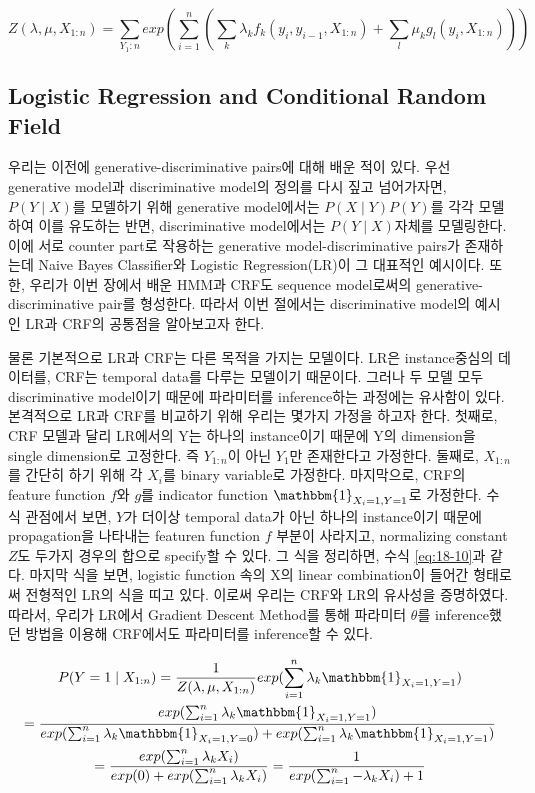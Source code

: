 \documentclass[draft=false]{oblivoir}
\begin{document}
\begin{equation}
	Z(\lambda,\mu,X_{1:n})=\sum_{Y_1:n}exp(\sum_{i=1}^{n}(\sum_k\lambda_k f_k(y_i,y_{i-1},X_{1:n})+\sum_l{\mu_k g_l(y_i,X_{1:n})}))
\label{eq:18-9}
\end{equation}

\subsection{Logistic Regression and Conditional Random Field}
우리는 이전에 generative-discriminative pairs에 대해 배운 적이 있다. 우선 generative model과 discriminative model의 정의를 다시 짚고 넘어가자면, $P(Y\mid X)$를 모델하기 위해 generative model에서는 $P(X\mid Y)P(Y)$를 각각 모델하여 이를 유도하는 반면, discriminative model에서는 $P(Y\mid X)$자체를 모델링한다. 이에 서로 counter part로 작용하는 generative model-discriminative pairs가 존재하는데 Naive Bayes Classifier와 Logistic Regression(LR)이 그 대표적인 예시이다. 또한, 우리가 이번 장에서 배운 HMM과 CRF도 sequence model로써의  generative-discriminative pair를 형성한다. 따라서 이번 절에서는 discriminative model의 예시인 LR과 CRF의 공통점을 알아보고자 한다.

물론 기본적으로 LR과 CRF는 다른 목적을 가지는 모델이다. LR은 instance중심의 데이터를, CRF는 temporal data를 다루는 모델이기 때문이다. 그러나 두 모델 모두 discriminative model이기 때문에 파라미터를 inference하는 과정에는 유사함이 있다. 
본격적으로 LR과 CRF를 비교하기 위해 우리는 몇가지 가정을 하고자 한다. 첫째로, CRF 모델과 달리 LR에서의 Y는 하나의 instance이기 때문에 Y의 dimension을 single dimension로 고정한다. 즉 $Y_{1:n}$이 아닌 $Y_1$만 존재한다고 가정한다. 둘째로, $X_{1:n}$를 간단히 하기 위해 각 $X_i$를 binary variable로 가정한다. 마지막으로, CRF의 feature function $f$와 $g$를 indicator function $\mathbbm{1}_{X_i=1, Y=1}$로 가정한다. 
수식 관점에서 보면, $Y$가 더이상 temporal data가 아닌 하나의 instance이기 때문에 propagation을 나타내는 featuren function $f$ 부분이 사라지고, normalizing constant $Z$도 두가지 경우의 합으로 specify할 수 있다. 그 식을 정리하면, 수식 \ref{eq:18-10}과 같다. 마지막 식을 보면, logistic function 속의 X의 linear combination이 들어간 형태로써 전형적인 LR의 식을 띠고 있다. 이로써 우리는 CRF와 LR의 유사성을 증명하였다.  따라서, 우리가 LR에서 Gradient Descent Method를 통해 파라미터 $\theta$를 inference했던 방법을 이용해 CRF에서도 파라미터를 inference할 수 있다.  

\begin{gather}
	P(Y=1\mid X_{1:n}) = {1 \over Z(\lambda,\mu,X_{1:n})} exp(\sum_{i=1}^n{\lambda_k\mathbbm{1}_{X_i=1, Y=1} }) \nonumber\\
    = {exp(\sum_{i=1}^n \lambda_k\mathbbm{1}_{X_i=1, Y=1} ) \over {exp(\sum_{i=1}^n{\lambda_k\mathbbm{1}_{X_i=1, Y=0} })+exp(\sum_{i=1}^n{\lambda_k\mathbbm{1}_{X_i=1, Y=1} })}}\nonumber\\
	= {exp(\sum_{i=1}^n\lambda_k X_i) \over exp(0)+exp(\sum_{i=1}^n\lambda_k X_i)}	= {1 \over exp(\sum_{i=1}^n-\lambda_k X_i)+1}
\label{eq:18-10}
\end{gather}
\end{document}
